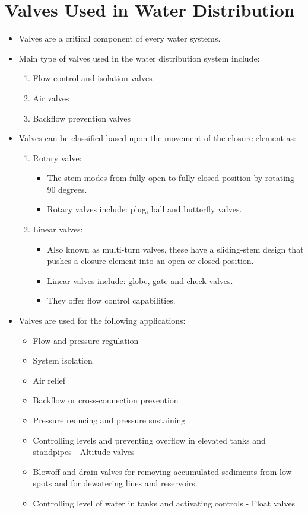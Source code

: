 \section{Valves Used in Water Distribution}
\begin{itemize}
\item  Valves are a critical component of every water systems.
\item Main type of valves used in the water distribution system include:
\begin{enumerate}
\item Flow control and isolation valves
\item Air valves
\item Backflow prevention valves
\end{enumerate}
\item Valves can be classified based upon the movement of the closure element as:
\begin{enumerate}
\item Rotary valve:
\begin{itemize}
\item The stem modes from fully open to fully closed position by rotating 90 degrees. 
\item Rotary valves include:  plug, ball and butterfly valves.
\end{itemize}
\item Linear valves:
\begin{itemize}
\item Also known as multi-turn valves, these have a sliding-stem design that pushes a closure element into an open or closed position.
\item Linear valves include:  globe, gate and check valves.
\item They offer flow control capabilities.
\end{itemize}
\end{enumerate}
\item Valves are used for the following applications:
\begin{itemize}
\item Flow and pressure regulation
\item System isolation
\item Air relief
\item Backflow or cross-connection prevention
\item Pressure reducing and pressure sustaining
\item Controlling levels and preventing overflow in elevated tanks and standpipes - Altitude valves
\item Blowoff and drain valves for removing accumulated sediments from low spots and for dewatering lines and reservoirs.
\item Controlling level of water in tanks and activating controls - Float valves
\end{itemize}
\end{itemize}
